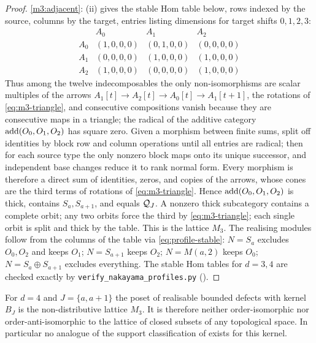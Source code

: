 \begin{proof}
\ref{m3:adjacent}: (ii) gives the stable Hom table below, rows indexed by the source, columns by the target, entries listing dimensions for target shifts \(0,1,2,3\):
\[
\begin{array}{c|ccc}
 & A_0 & A_1 & A_2\\ \hline
 A_0 & (1,0,0,0) & (0,1,0,0) & (0,0,0,0)\\
 A_1 & (0,0,0,0) & (1,0,0,0) & (1,0,0,0)\\
 A_2 & (1,0,0,0) & (0,0,0,0) & (1,0,0,0)
\end{array}
\]
Thus among the twelve indecomposables the only non-isomorphisms are scalar multiples of the arrows
\(A_1[t]\to A_2[t]\to A_0[t]\to A_1[t+1]\), the rotations of \eqref{eq:m3-triangle}, and consecutive compositions vanish because they are consecutive maps in a triangle; the radical of the additive category \(\operatorname{add}(O_0,O_1,O_2)\) has square zero.  Given a morphism between finite sums, split off identities by block row and column operations until all entries are radical; then for each source type the only nonzero block maps onto its unique successor, and independent base changes reduce it to rank normal form.  Every morphism is therefore a direct sum of identities, zeros, and copies of the arrows, whose cones are the third terms of rotations of \eqref{eq:m3-triangle}.  Hence \(\operatorname{add}(O_0,O_1,O_2)\) is thick, contains \(S_a,S_{a+1}\), and equals \(\mathcal Q_J\).  A nonzero thick subcategory contains a complete orbit; any two orbits force the third by \eqref{eq:m3-triangle}; each single orbit is split and thick by the table.  This is the lattice \(M_3\).  The realising modules follow from the columns of the table via \eqref{eq:profile-stable}: \(N=S_a\) excludes \(O_0,O_2\) and keeps \(O_1\); \(N=S_{a+1}\) keeps \(O_2\); \(N=M(a,2)\) keeps \(O_0\); \(N=S_a\oplus S_{a+1}\) excludes everything.  The stable Hom tables for \(d=3,4\) are checked exactly by \texttt{verify\_nakayama\_profiles.py} ().
\end{proof}

\begin{corollary}\label{cor:non-distributive}
For \(d=4\) and \(J=\{a,a+1\}\) the poset of realisable bounded defects with kernel \(B_J\) is the non-distributive lattice \(M_3\).  It is therefore neither order-isomorphic nor order-anti-isomorphic to the lattice of closed subsets of any topological space.  In particular no analogue of the support classification of  exists for this kernel.
\end{corollary}

